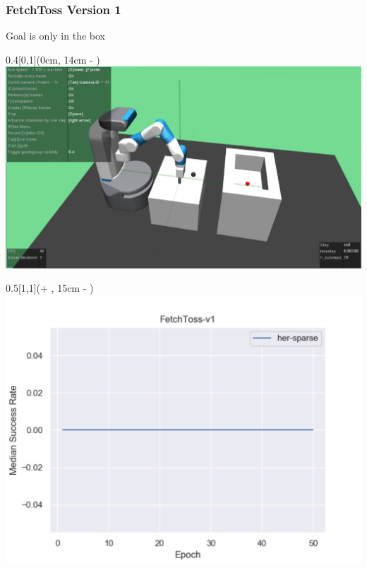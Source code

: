 


\begin{frame}
	\frametitle{FetchToss Version 1}	
	\vspace{1cm}
	
	Goal is only in the box
	
	\begin{textblock*}{0.4\paperwidth}[0,1](0cm, 14cm - \PraesentationSeitenrand)%
		\includegraphics[width=0.4\paperwidth]{./Ressourcen/Figures/FetchToss-v1.pdf}
	\end{textblock*}
	
	\begin{textblock*}{0.5\paperwidth}[1,1](\textwidth + \PraesentationSeitenrand, 15cm - \PraesentationSeitenrand)%
		\includegraphics[width=0.5\paperwidth]{./Ressourcen/Figures/fig_FetchToss-v1.pdf}
	\end{textblock*}
	
	
\end{frame}
\clearpage

